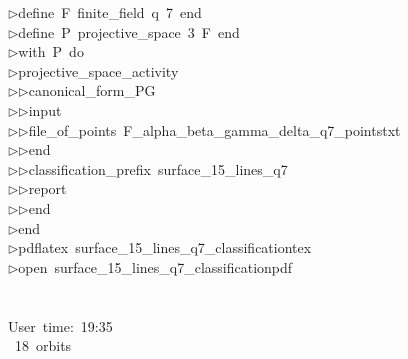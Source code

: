 \begin{tabbing}
$\triangleright$\>define\ F\ finite\_field\ q\ 7\ end\ \\[0pt]
$\triangleright$\>define\ P\ projective\_space\ 3\ F\ end\ \\[0pt]
$\triangleright$\>with\ P\ do\ \\[0pt]
$\triangleright$\>projective\_space\_activity\ \\[0pt]
$\triangleright$\>$\triangleright$\>canonical\_form\_PG\ \\[0pt]
$\triangleright$\>$\triangleright$\>input\ \\[0pt]
$\triangleright$\>$\triangleright$\>file\_of\_points\ F\_alpha\_beta\_gamma\_delta\_q7\_pointstxt\ \\[0pt]
$\triangleright$\>$\triangleright$\>end\ \\[0pt]
$\triangleright$\>$\triangleright$\>classification\_prefix\ surface\_15\_lines\_q7\ \\[0pt]
$\triangleright$\>$\triangleright$\>report\ \\[0pt]
$\triangleright$\>$\triangleright$\>end\ \\[0pt]
$\triangleright$\>end\\[0pt]
$\triangleright$\>pdflatex\ surface\_15\_lines\_q7\_classificationtex\\[0pt]
$\triangleright$\>open\ surface\_15\_lines\_q7\_classificationpdf\\[0pt]
\\[0pt]
\\[0pt]
User\ time:\ 19:35\\[0pt]
\ 18\ orbits\end{tabbing}
